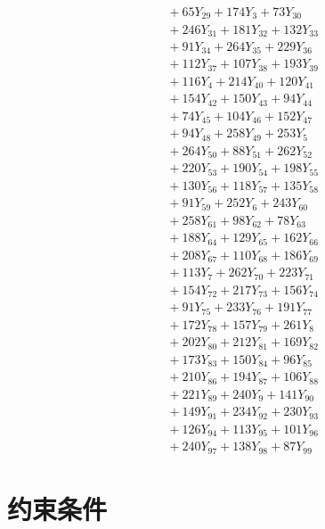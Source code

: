 \documentclass[a4paper,10pt]{article}
\begin{document}
{\begin{align}
&\quad  + 65Y_{29} + 174Y_{3} + 73Y_{30} \\[0.5ex]
&\quad  + 246Y_{31} + 181Y_{32} + 132Y_{33} \\[0.5ex]
&\quad  + 91Y_{34} + 264Y_{35} + 229Y_{36} \\[0.5ex]
&\quad  + 112Y_{37} + 107Y_{38} + 193Y_{39} \\[0.5ex]
&\quad  + 116Y_{4} + 214Y_{40} + 120Y_{41} \\[0.5ex]
&\quad  + 154Y_{42} + 150Y_{43} + 94Y_{44} \\[0.5ex]
&\quad  + 74Y_{45} + 104Y_{46} + 152Y_{47} \\[0.5ex]
&\quad  + 94Y_{48} + 258Y_{49} + 253Y_{5} \\[0.5ex]
&\quad  + 264Y_{50} + 88Y_{51} + 262Y_{52} \\[0.5ex]
&\quad  + 220Y_{53} + 190Y_{54} + 198Y_{55} \\[0.5ex]
&\quad  + 130Y_{56} + 118Y_{57} + 135Y_{58} \\[0.5ex]
&\quad  + 91Y_{59} + 252Y_{6} + 243Y_{60} \\[0.5ex]
&\quad  + 258Y_{61} + 98Y_{62} + 78Y_{63} \\[0.5ex]
&\quad  + 188Y_{64} + 129Y_{65} + 162Y_{66} \\[0.5ex]
&\quad  + 208Y_{67} + 110Y_{68} + 186Y_{69} \\[0.5ex]
&\quad  + 113Y_{7} + 262Y_{70} + 223Y_{71} \\[0.5ex]
&\quad  + 154Y_{72} + 217Y_{73} + 156Y_{74} \\[0.5ex]
&\quad  + 91Y_{75} + 233Y_{76} + 191Y_{77} \\[0.5ex]
&\quad  + 172Y_{78} + 157Y_{79} + 261Y_{8} \\[0.5ex]
&\quad  + 202Y_{80} + 212Y_{81} + 169Y_{82} \\[0.5ex]
&\quad  + 173Y_{83} + 150Y_{84} + 96Y_{85} \\[0.5ex]
&\quad  + 210Y_{86} + 194Y_{87} + 106Y_{88} \\[0.5ex]
&\quad  + 221Y_{89} + 240Y_{9} + 141Y_{90} \\[0.5ex]
&\quad  + 149Y_{91} + 234Y_{92} + 230Y_{93} \\[0.5ex]
&\quad  + 126Y_{94} + 113Y_{95} + 101Y_{96} \\[0.5ex]
&\quad  + 240Y_{97} + 138Y_{98} + 87Y_{99}\nonumber
\end{align}
}

\section{约束条件}
\end{document}
